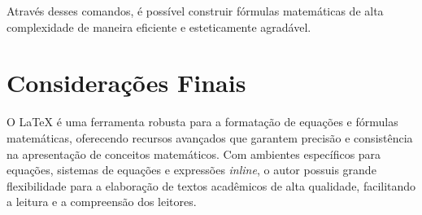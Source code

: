 Através desses comandos, é possível construir fórmulas matemáticas de alta complexidade de maneira eficiente e esteticamente agradável.

\section{Considerações Finais}

O LaTeX é uma ferramenta robusta para a formatação de equações e fórmulas matemáticas, oferecendo recursos avançados que garantem precisão e consistência na apresentação de conceitos matemáticos. Com ambientes específicos para equações, sistemas de equações e expressões \textit{inline}, o autor possuis grande flexibilidade para a elaboração de textos acadêmicos de alta qualidade, facilitando a leitura e a compreensão dos leitores.
